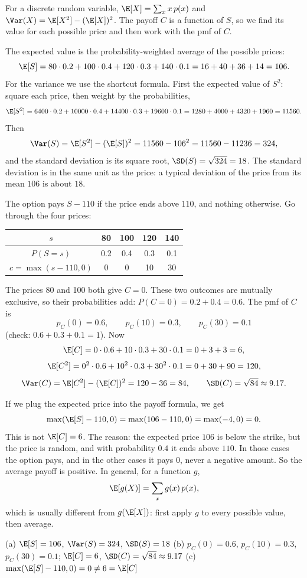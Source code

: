 \begin{solution}
	\idea For a discrete random variable, $\E[X]=\sum_x x\,p(x)$ and
	$\Var(X)=\E[X^2]-(\E[X])^2$. The payoff $C$ is a function of $S$, so we
	find its value for each possible price and then work with the pmf of $C$.

	 The expected value is the probability-weighted average of the
	possible prices:
	\[ \E[S]=80\cdot0.2+100\cdot0.4+120\cdot0.3+140\cdot0.1
		=16+40+36+14=106. \]
	For the variance we use the shortcut formula. First the expected value of
	$S^2$: square each price, then weight by the probabilities,
	\[ \E[S^2]=6400\cdot0.2+10000\cdot0.4+14400\cdot0.3+19600\cdot0.1
		=1280+4000+4320+1960=11560. \]
	Then
	\[ \Var(S)=\E[S^2]-(\E[S])^2=11560-106^2=11560-11236=324, \]
	and the standard deviation is its square root, $\SD(S)=\sqrt{324}=18$.
	The standard deviation is in the same unit as the price: a typical
	deviation of the price from its mean $106$ is about $18$.

	 The option pays $S-110$ if the price ends above $110$, and
	nothing otherwise. Go through the four prices:
	\begin{center}
		\begin{tabular}{c|cccc}
			$s$                & 80  & 100 & 120 & 140 \\\hline
			$P(S=s)$           & 0.2 & 0.4 & 0.3 & 0.1 \\
			$c=\max(s-110,0)$  & 0   & 0   & 10  & 30
		\end{tabular}
	\end{center}
	The prices 80 and 100 both give $C=0$. These two outcomes are mutually
	exclusive, so their probabilities add: $P(C=0)=0.2+0.4=0.6$. The pmf of $C$
	is
	\[ p_C(0)=0.6,\qquad p_C(10)=0.3,\qquad p_C(30)=0.1 \]
	(check: $0.6+0.3+0.1=1$). Now
	\[ \E[C]=0\cdot0.6+10\cdot0.3+30\cdot0.1=0+3+3=6, \]
	\[ \E[C^2]=0^2\cdot0.6+10^2\cdot0.3+30^2\cdot0.1=0+30+90=120, \]
	\[ \Var(C)=\E[C^2]-(\E[C])^2=120-36=84,\qquad
		\SD(C)=\sqrt{84}\approx9.17. \]

	 If we plug the expected price into the payoff formula, we get
	\[ \max(\E[S]-110,0)=\max(106-110,0)=\max(-4,0)=0. \]
	This is not $\E[C]=6$. The reason: the expected price $106$ is below the
	strike, but the price is random, and with probability $0.4$ it ends above
	$110$. In those cases the option pays, and in the other cases it pays $0$,
	never a negative amount. So the average payoff is positive. In general,
	for a function $g$,
	\[ \E[g(X)]=\sum_x g(x)\,p(x), \]
	which is usually different from $g(\E[X])$: first apply $g$ to every
	possible value, then average.
	\begin{answer}
		(a) $\E[S]=106$, $\Var(S)=324$, $\SD(S)=18$ \quad
		(b) $p_C(0)=0.6$, $p_C(10)=0.3$, $p_C(30)=0.1$; $\E[C]=6$,
		$\SD(C)=\sqrt{84}\approx9.17$ \quad
		(c) $\max(\E[S]-110,0)=0\neq6=\E[C]$
	\end{answer}
\end{solution}
